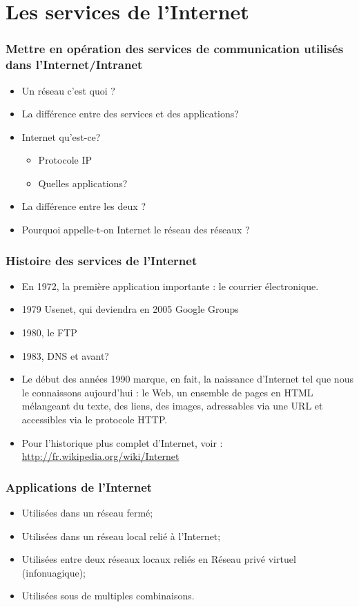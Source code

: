 	\section{Les services de l’Internet}
	\begin{frame}
		\frametitle{Mettre en opération des services de
			communication utilisés dans l’Internet/Intranet}
		
		\begin{itemize}
			\item  Un réseau c'est quoi ?
			\item La différence entre des services et
			des applications?
			\item Internet qu'est-ce?
			\begin{itemize}
				\item Protocole IP
				\item Quelles applications?
			\end{itemize}
			
			\item La différence entre les deux ?
			\item Pourquoi appelle-t-on Internet le réseau des
			réseaux
			?\end{itemize}
	\end{frame}
	\begin{frame}[containsverbatim]
		\frametitle{Histoire des services de l'Internet}
		\begin{itemize}
			\item  En 1972, la première application importante : le
			courrier électronique.
			\item 1979 Usenet, qui deviendra en 2005 Google Groups
			\item 1980, le FTP
			\item 1983, DNS et avant?
			\item Le début des années 1990 marque, en fait, la
			naissance d'Internet tel que nous le connaissons
			aujourd'hui : le Web, un ensemble de pages en
			HTML mélangeant du texte, des liens, des images,
			adressables via une URL et accessibles via le
			protocole HTTP.
			\item  Pour l'historique plus complet d'Internet, voir :
			\url{ http://fr.wikipedia.org/wiki/Internet}
		\end{itemize}
		
	\end{frame}
	
	
	\begin{frame}[containsverbatim]
		\frametitle{Applications de l’Internet}
		\begin{itemize}
			\item Utilisées dans un réseau fermé;
			\item Utilisées dans un réseau local relié à l’Internet;
			\item Utilisées entre deux réseaux locaux reliés en Réseau privé virtuel (infonuagique);
			\item Utilisées sous de multiples combinaisons.
			
		\end{itemize}
		
	\end{frame}
	
